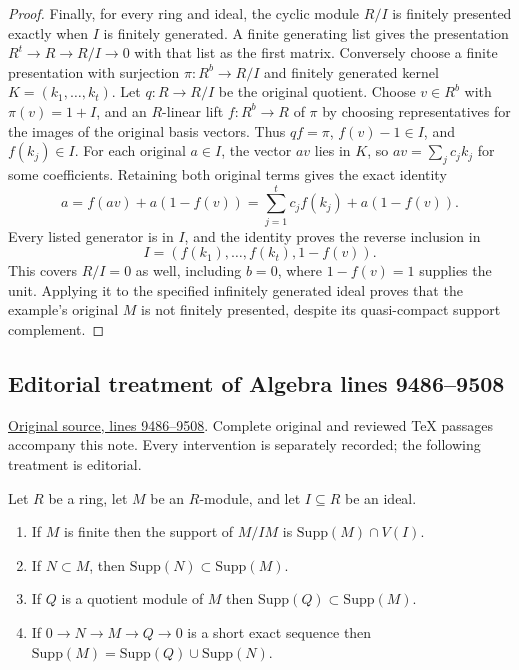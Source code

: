 \begin{proof}
Finally, for every ring and ideal, the cyclic module
$R/I$ is finitely presented exactly when $I$ is
finitely generated. A finite generating list gives
the presentation $R^t\to R\to R/I\to0$ with that
list as the first matrix. Conversely choose a finite
presentation with surjection $\pi:R^b\to R/I$ and
finitely generated kernel $K=(k_1,\ldots,k_t)$.
Let $q:R\to R/I$ be the original quotient. Choose
$v\in R^b$ with $\pi(v)=1+I$, and an $R$-linear
lift $f:R^b\to R$ of $\pi$ by choosing representatives
for the images of the original basis vectors.
Thus $qf=\pi$, $f(v)-1\in I$, and $f(k_j)\in I$.
For each original $a\in I$, the vector $av$ lies
in $K$, so $av=\sum_j c_jk_j$ for some coefficients.
Retaining both original terms gives the exact identity
$$
a=f(av)+a(1-f(v))
=\sum_{j=1}^t c_jf(k_j)+a(1-f(v)).
$$
Every listed generator is in $I$, and the identity
proves the reverse inclusion in
$$
I=(f(k_1),\ldots,f(k_t),1-f(v)).
$$
This covers $R/I=0$ as well, including $b=0$, where
$1-f(v)=1$ supplies the unit. Applying it to the
specified infinitely generated ideal proves that the
example's original $M$ is not finitely presented,
despite its quasi-compact support complement.
\end{proof}


\subsection{Editorial treatment of Algebra lines 9486--9508}

\hypertarget{algebra-context-104}{}

\noindent\href{https://github.com/stacks/stacks-project/blob/a04446e57ec1fbc252a871afcec7752fb2807b14/algebra.tex\#L9486}{Original source, lines 9486--9508}. Complete original and reviewed TeX passages accompany this note. Every intervention is separately recorded; the following treatment is editorial.


\begin{lemma}
\label{editorial-source-lemma-support-quotient}
Let $R$ be a ring, let $M$ be an $R$-module, and let $I\subseteq R$ be an ideal.
\begin{enumerate}
\item If $M$ is finite then the support
of $M/IM$ is $\text{Supp}(M) \cap V(I)$.
\item If $N \subset M$, then $\text{Supp}(N) \subset
\text{Supp}(M)$.
\item If $Q$ is a quotient module of $M$ then $\text{Supp}(Q) \subset
\text{Supp}(M)$.
\item If $0 \to N \to M \to Q \to 0$ is a short exact sequence
then $\text{Supp}(M) = \text{Supp}(Q) \cup \text{Supp}(N)$.
\end{enumerate}
\end{lemma}

